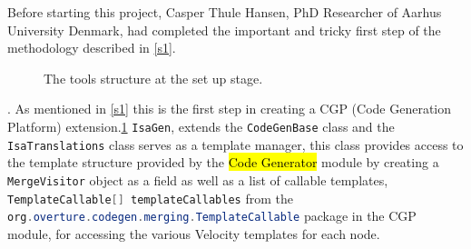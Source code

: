 	Before starting this project, Casper Thule Hansen, PhD Researcher of Aarhus University Denmark\parencite{casper}, had completed the important and tricky first step of the methodology described in \ref{s1}.\parencite{VDM2ISAGit}
	\begin{figure}
        \caption{\label{fig:toolStructure} The tools structure at the set up stage. \parencite{vdmwikiast}}
     \end{figure}.
    As mentioned in \ref{s1} this is the first step in creating a CGP (Code Generation Platform) extension.\ref{fig:toolStructure} \lstinline[language=Java]{IsaGen}, extends the \lstinline[language=Java]{CodeGenBase} class and the \lstinline[language=Java]{IsaTranslations} class serves as a template manager, this class provides access to the template structure provided by the \ttfamily\hl{Code Generator} \rmfamily module by creating a \lstinline[language=Java]{MergeVisitor} object as a field as well as a list of callable templates, \lstinline[language=Java]{TemplateCallable[] templateCallables} from the \lstinline[language=Java]{org.overture.codegen.merging.TemplateCallable} package in the CGP module, for accessing the various Velocity templates for each node.

